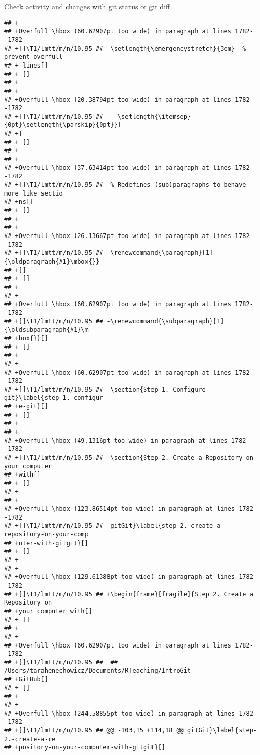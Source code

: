 \documentclass[ignorenonframetext,]{beamer}
\begin{document}
\begin{frame}[fragile]{Check activity and changes with git status or git
diff}
\begin{verbatim}
## +
## +Overfull \hbox (60.62907pt too wide) in paragraph at lines 1782--1782
## +[]\T1/lmtt/m/n/10.95 ##  \setlength{\emergencystretch}{3em}  % prevent overfull
## + lines[] 
## + []
## +
## +
## +Overfull \hbox (20.38794pt too wide) in paragraph at lines 1782--1782
## +[]\T1/lmtt/m/n/10.95 ##    \setlength{\itemsep}{0pt}\setlength{\parskip}{0pt}}[
## +] 
## + []
## +
## +
## +Overfull \hbox (37.63414pt too wide) in paragraph at lines 1782--1782
## +[]\T1/lmtt/m/n/10.95 ## -% Redefines (sub)paragraphs to behave more like sectio
## +ns[] 
## + []
## +
## +
## +Overfull \hbox (26.13667pt too wide) in paragraph at lines 1782--1782
## +[]\T1/lmtt/m/n/10.95 ## -\renewcommand{\paragraph}[1]{\oldparagraph{#1}\mbox{}}
## +[] 
## + []
## +
## +
## +Overfull \hbox (60.62907pt too wide) in paragraph at lines 1782--1782
## +[]\T1/lmtt/m/n/10.95 ## -\renewcommand{\subparagraph}[1]{\oldsubparagraph{#1}\m
## +box{}}[] 
## + []
## +
## +
## +Overfull \hbox (60.62907pt too wide) in paragraph at lines 1782--1782
## +[]\T1/lmtt/m/n/10.95 ## -\section{Step 1. Configure git}\label{step-1.-configur
## +e-git}[] 
## + []
## +
## +
## +Overfull \hbox (49.1316pt too wide) in paragraph at lines 1782--1782
## +[]\T1/lmtt/m/n/10.95 ## -\section{Step 2. Create a Repository on your computer 
## +with[] 
## + []
## +
## +
## +Overfull \hbox (123.86514pt too wide) in paragraph at lines 1782--1782
## +[]\T1/lmtt/m/n/10.95 ## -gitGit}\label{step-2.-create-a-repository-on-your-comp
## +uter-with-gitgit}[] 
## + []
## +
## +
## +Overfull \hbox (129.61388pt too wide) in paragraph at lines 1782--1782
## +[]\T1/lmtt/m/n/10.95 ## +\begin{frame}[fragile]{Step 2. Create a Repository on 
## +your computer with[] 
## + []
## +
## +
## +Overfull \hbox (60.62907pt too wide) in paragraph at lines 1782--1782
## +[]\T1/lmtt/m/n/10.95 ##  ## /Users/tarahenechowicz/Documents/RTeaching/IntroGit
## +GitHub[] 
## + []
## +
## +
## +Overfull \hbox (244.58855pt too wide) in paragraph at lines 1782--1782
## +[]\T1/lmtt/m/n/10.95 ## @@ -103,15 +114,18 @@ gitGit}\label{step-2.-create-a-re
## +pository-on-your-computer-with-gitgit}[] 

\end{verbatim}
\end{frame}
\end{document}
